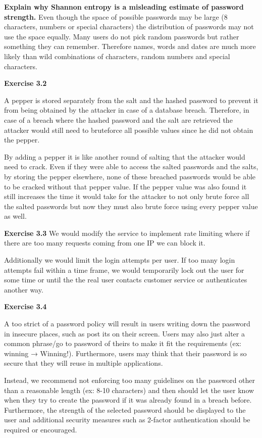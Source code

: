 \documentclass[11pt]{article}
\newcommand{\exercise}[1]{{\vspace{6pt}\noindent\textbf{Exercise #1}}\quad}
\begin{document}
\textbf{Explain why Shannon entropy is a misleading estimate of password strength.}
Even though the space of possible passwords may be large (8 characters, numbers or special characters) the distribution of passwords may not use the space equally. Many users do not pick random passwords but rather something they can remember. Therefore names, words and dates are much more likely than wild combinations of characters, random numbers and special characters.

\exercise{3.2}

A pepper is stored separately from the salt and the hashed password to prevent it from being obtained by the attacker in case of a database breach. Therefore, in case of a breach where the hashed password and the salt are retrieved the attacker would still need to bruteforce all possible values since he  did not obtain the pepper. 

By adding a pepper it is like another round of salting that the attacker would need to crack. Even if they were able to access the salted passwords and the salts, by storing the pepper elsewhere, none of these breached passwords would be able to be cracked without that pepper value. If the pepper value was also found it still increases the time it would take for the attacker to not only brute force all the salted passwords but now they must also brute force using every pepper value as well.

\exercise{3.3}
We would modify the service to implement rate limiting where if there are too many requests coming from one IP we can block it. 

Additionally we would limit the login attempts per user. If too many login attempts fail within a time frame, we would temporarily lock out the user for some time or until the the real user contacts customer service or authenticates another way.

\exercise{3.4}

A too strict of a password policy will result in users writing down the password in insecure places, such as post its on their screen. Users may also just alter a common phrase/go to password of theirs to make it fit the requirements (ex: winning → Winning!). Furthermore, users may think that their password is so secure that they will reuse in multiple applications.

Instead, we recommend not enforcing too many guidelines on the password other than a reasonable length (ex: 8-10 characters) and then should let the user know when they try to create the password if it was already found in a breach before. Furthermore, the strength of the selected password should be displayed to the user and additional security measures such as 2-factor authentication should be required or encouraged.
\end{document}
